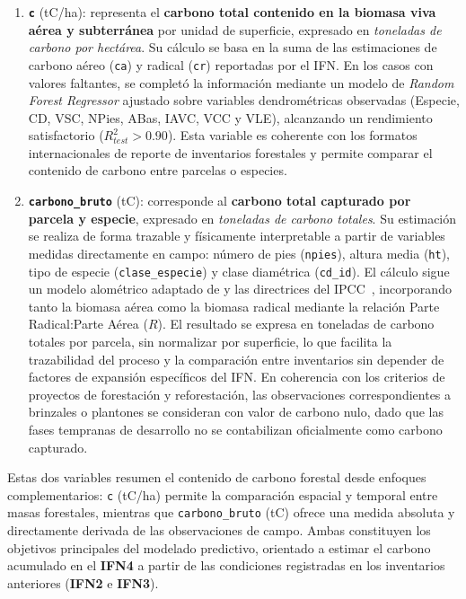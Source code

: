 \begin{enumerate}
    \item \textbf{\texttt{c}} (tC/ha): representa el \textbf{carbono total contenido en la biomasa viva aérea y subterránea} por unidad de superficie, expresado en \emph{toneladas de carbono por hectárea}.
          Su cálculo se basa en la suma de las estimaciones de carbono aéreo (\texttt{ca}) y radical (\texttt{cr}) reportadas por el IFN.
          En los casos con valores faltantes, se completó la información mediante un modelo de \emph{Random Forest Regressor} ajustado sobre variables dendrométricas observadas (Especie, CD, VSC, NPies, ABas, IAVC, VCC y VLE), alcanzando un rendimiento satisfactorio (\(R^2_{test} > 0.90\)).
          Esta variable es coherente con los formatos internacionales de reporte de inventarios forestales y permite comparar el contenido de carbono entre parcelas o especies.


    \item \textbf{\texttt{carbono\_bruto}} (tC): corresponde al \textbf{carbono total capturado por parcela y especie}, expresado en \emph{toneladas de carbono totales}.
          Su estimación se realiza de forma trazable y físicamente interpretable a partir de variables medidas directamente en campo: número de pies (\texttt{npies}), altura media (\texttt{ht}), tipo de especie (\texttt{clase\_especie}) y clase diamétrica (\texttt{cd\_id}).
          El cálculo sigue un modelo alométrico adaptado de \cite{chave2014} y las directrices del IPCC~\cite{IPCC2006}, incorporando tanto la biomasa aérea como la biomasa radical mediante la relación Parte Radical:Parte Aérea ($R$).
          El resultado se expresa en toneladas de carbono totales por parcela, sin normalizar por superficie, lo que facilita la trazabilidad del proceso y la comparación entre inventarios sin depender de factores de expansión específicos del IFN.
          En coherencia con los criterios de proyectos de forestación y reforestación, las observaciones correspondientes a brinzales o plantones se consideran con valor de carbono nulo, dado que las fases tempranas de desarrollo no se contabilizan oficialmente como carbono capturado.
\end{enumerate}


Estas dos variables resumen el contenido de carbono forestal desde enfoques complementarios:
\texttt{c} (tC/ha) permite la comparación espacial y temporal entre masas forestales, mientras que \texttt{carbono\_bruto} (tC) ofrece una medida absoluta y directamente derivada de las observaciones de campo.
Ambas constituyen los objetivos principales del modelado predictivo, orientado a estimar el carbono acumulado en el \textbf{IFN4} a partir de las condiciones registradas en los inventarios anteriores (\textbf{IFN2} e \textbf{IFN3}).

